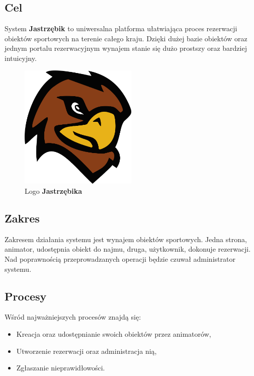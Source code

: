 \documentclass[a4paper,11pt]{article}
\begin{document}
    \subsection{Cel} 

    System \textbf{Jastrzębik} to uniwersalna platforma ułatwiająca proces rezerwacji obiektów sportowych na terenie całego kraju. Dzięki dużej bazie obiektów oraz jednym portalu rezerwacyjnym wynajem stanie się dużo prostszy oraz bardziej intuicyjny.

    \begin{figure}[ht] 
    	\begin{center}
    		\includegraphics[width=0.5\textwidth]{img1/Logo.png}
            \caption{Logo \textbf{Jastrzębika}}
    	\end{center}
    \end{figure}

    \subsection{Zakres}
    
    Zakresem działania systemu jest wynajem obiektów sportowych. Jedna strona, animator, udostępnia obiekt do najmu, druga, użytkownik, dokonuje rezerwacji. Nad poprawnością przeprowadzanych operacji będzie czuwał administrator systemu.

    \subsection{Procesy}
    Wśród najważniejszych procesów znajdą się:
    
    \begin{itemize}
        \item Kreacja oraz udostępnianie swoich obiektów przez animatorów,
        \item Utworzenie rezerwacji oraz administracja nią,
        \item Zgłaszanie nieprawidłowości.
    \end{itemize}
\end{document}

